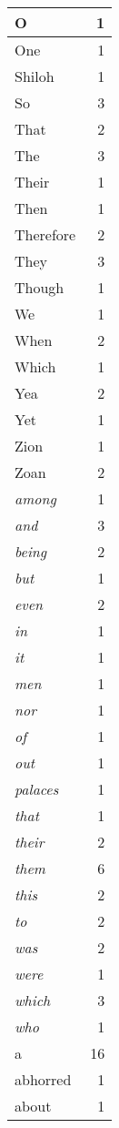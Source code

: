\begin{center}
\begin{longtable}{l|r}
O & 1\\ \hline 
One & 1\\ \hline 
Shiloh & 1\\ \hline 
So & 3\\ \hline 
That & 2\\ \hline 
The & 3\\ \hline 
Their & 1\\ \hline 
Then & 1\\ \hline 
Therefore & 2\\ \hline 
They & 3\\ \hline 
Though & 1\\ \hline 
We & 1\\ \hline 
When & 2\\ \hline 
Which & 1\\ \hline 
Yea & 2\\ \hline 
Yet & 1\\ \hline 
Zion & 1\\ \hline 
Zoan & 2\\ \hline 
\emph{among} & 1\\ \hline 
\emph{and} & 3\\ \hline 
\emph{being} & 2\\ \hline 
\emph{but} & 1\\ \hline 
\emph{even} & 2\\ \hline 
\emph{in} & 1\\ \hline 
\emph{it} & 1\\ \hline 
\emph{men} & 1\\ \hline 
\emph{nor} & 1\\ \hline 
\emph{of} & 1\\ \hline 
\emph{out} & 1\\ \hline 
\emph{palaces} & 1\\ \hline 
\emph{that} & 1\\ \hline 
\emph{their} & 2\\ \hline 
\emph{them} & 6\\ \hline 
\emph{this} & 2\\ \hline 
\emph{to} & 2\\ \hline 
\emph{was} & 2\\ \hline 
\emph{were} & 1\\ \hline 
\emph{which} & 3\\ \hline 
\emph{who} & 1\\ \hline 
a & 16\\ \hline 
abhorred & 1\\ \hline 
about & 1\\ \hline 

\end{longtable}
\end{center}
